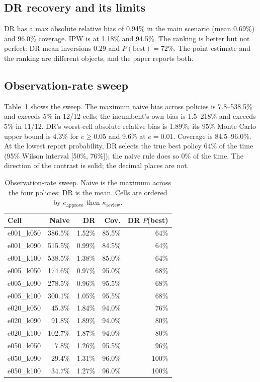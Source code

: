 \documentclass[conference]{IEEEtran}
\begin{document}
\subsection{DR recovery and its limits}
DR has a max absolute relative bias of 0.94\% in the main scenario (mean 0.69\%) and 96.0\% coverage. IPW is at 1.18\% and 94.5\%. The ranking is better but not perfect: DR mean inversions 0.29 and $P(\text{best})=72\%$. The point estimate and the ranking are different objects, and the paper reports both.

\subsection{Observation-rate sweep}
Table~\ref{tab:sweep} shows the sweep. The maximum naive bias across policies is 7.8--538.5\% and exceeds 5\% in 12/12 cells; the incumbent's own bias is 1.5--218\% and exceeds 5\% in 11/12. DR's worst-cell absolute relative bias is 1.89\%; its $95\%$ Monte Carlo upper bound is 4.3\% for $e\ge0.05$ and 9.6\% at $e=0.01$. Coverage is 84.5--96.0\%. At the lowest report probability, DR selects the true best policy 64\% of the time (95\% Wilson interval [50\%, 76\%]); the naive rule does so 0\% of the time. The direction of the contrast is solid; the decimal places are not.

\begin{table}[t]
\centering
\caption{Observation-rate sweep. Naive is the maximum across the four policies; DR is the mean. Cells are ordered by $e_{\text{approve}}$ then $\kappa_{\text{review}}$.}
\label{tab:sweep}
\footnotesize
\begin{tabular}{lrrrr}
\toprule
Cell & Naive & DR & Cov. & DR $P$(best)\\
\midrule
e001\_k050 & 386.5\% & 1.52\% & 85.5\% & 64\%\\
e001\_k090 & 515.5\% & 0.99\% & 84.5\% & 64\%\\
e001\_k100 & 538.5\% & 1.38\% & 85.0\% & 64\%\\
e005\_k050 & 174.6\% & 0.97\% & 95.0\% & 68\%\\
e005\_k090 & 278.5\% & 0.96\% & 95.5\% & 68\%\\
e005\_k100 & 300.1\% & 1.05\% & 95.5\% & 68\%\\
e020\_k050 & 45.3\% & 1.84\% & 94.0\% & 76\%\\
e020\_k090 & 91.8\% & 1.89\% & 94.0\% & 80\%\\
e020\_k100 & 102.7\% & 1.87\% & 94.0\% & 80\%\\
e050\_k050 & 7.8\% & 1.26\% & 95.5\% & 96\%\\
e050\_k090 & 29.4\% & 1.31\% & 96.0\% & 100\%\\
e050\_k100 & 34.7\% & 1.27\% & 96.0\% & 100\%\\
\bottomrule
\end{tabular}
\end{table}
\end{document}
